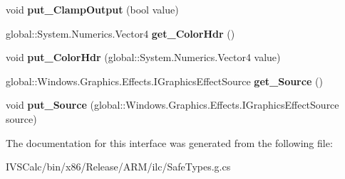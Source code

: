 \begin{DoxyCompactItemize}
void {\bfseries put\+\_\+\+Clamp\+Output} (bool value)
\item 
\mbox{\label{interface_microsoft_1_1_graphics_1_1_canvas_1_1_effects_1_1_i_tint_effect_afb63c71fa3347d9d70b3a6af7f2c05f0}} 
global\+::\+System.\+Numerics.\+Vector4 {\bfseries get\+\_\+\+Color\+Hdr} ()
\item 
\mbox{\label{interface_microsoft_1_1_graphics_1_1_canvas_1_1_effects_1_1_i_tint_effect_ad0bd40be0fe7e352f9d1a9407f7c32a8}} 
void {\bfseries put\+\_\+\+Color\+Hdr} (global\+::\+System.\+Numerics.\+Vector4 value)
\item 
\mbox{\label{interface_microsoft_1_1_graphics_1_1_canvas_1_1_effects_1_1_i_tint_effect_aaf0626b4108a593e2255ee54368f6526}} 
global\+::\+Windows.\+Graphics.\+Effects.\+I\+Graphics\+Effect\+Source {\bfseries get\+\_\+\+Source} ()
\item 
\mbox{\label{interface_microsoft_1_1_graphics_1_1_canvas_1_1_effects_1_1_i_tint_effect_a956f6e4a96e8243eaea0b5c74184238f}} 
void {\bfseries put\+\_\+\+Source} (global\+::\+Windows.\+Graphics.\+Effects.\+I\+Graphics\+Effect\+Source source)
\end{DoxyCompactItemize}


The documentation for this interface was generated from the following file\+:\begin{DoxyCompactItemize}
\item 
I\+V\+S\+Calc/bin/x86/\+Release/\+A\+R\+M/ilc/Safe\+Types.\+g.\+cs\end{DoxyCompactItemize}
